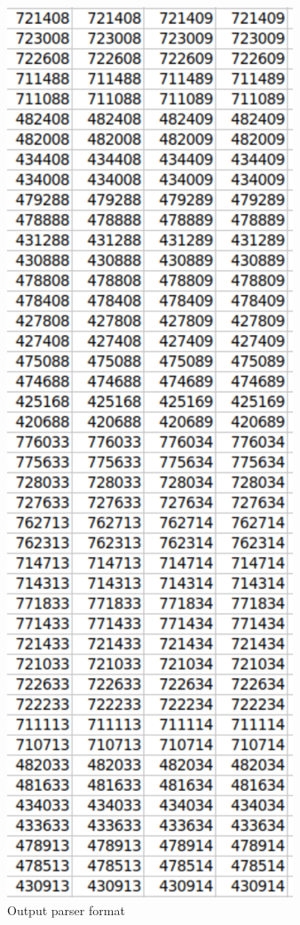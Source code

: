 \documentclass[letterpaper, 10 pt, conference]{IEEEconf}  %
\begin{document}
\begin{figure}[H]
\centering
\includegraphics[scale=.5]{outputparser.png} 
\caption{Output parser format}
\end{figure}
\end{document}
